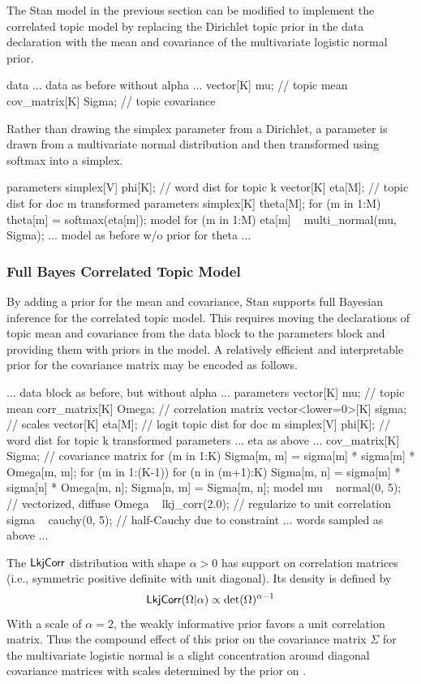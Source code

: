 The Stan model in the previous section can be modified to implement
the correlated topic model by replacing the Dirichlet topic prior
 in the data declaration with the mean and covariance of
the multivariate logistic normal prior.
%
\begin{stancode}
data {
  ... data as before without alpha ...
  vector[K] mu;          // topic mean
  cov_matrix[K] Sigma;   // topic covariance
}
\end{stancode}
%
Rather than drawing the simplex parameter  from a
Dirichlet, a parameter  is drawn from a multivariate normal
distribution and then transformed using softmax into a simplex.
%
\begin{stancode}
parameters {
  simplex[V] phi[K];  // word dist for topic k
  vector[K] eta[M];   // topic dist for doc m
}
transformed parameters {
  simplex[K] theta[M];
  for (m in 1:M)
    theta[m] = softmax(eta[m]);
}
model {
  for (m in 1:M)
    eta[m] ~ multi_normal(mu, Sigma);
  ... model as before w/o prior for theta ...
}
\end{stancode}

\subsubsection{Full Bayes Correlated Topic Model}

By adding a prior for the mean and covariance, Stan supports full
Bayesian inference for the correlated topic model.  This requires
moving the declarations of topic mean  and covariance 
from the data block to the parameters block and providing them with
priors in the model.  A relatively efficient and interpretable prior
for the covariance matrix  may be encoded as follows.
%
\begin{stancode}
... data block as before, but without alpha ...
parameters {
  vector[K] mu;              // topic mean
  corr_matrix[K] Omega;      // correlation matrix
  vector<lower=0>[K] sigma;  // scales
  vector[K] eta[M];          // logit topic dist for doc m
  simplex[V] phi[K];         // word dist for topic k
}
transformed parameters {
  ... eta as above ...
  cov_matrix[K] Sigma;       // covariance matrix
  for (m in 1:K)
    Sigma[m, m] = sigma[m] * sigma[m] * Omega[m, m];
  for (m in 1:(K-1)) {
    for (n in (m+1):K) {
      Sigma[m, n] = sigma[m] * sigma[n] * Omega[m, n];
      Sigma[n, m] = Sigma[m, n];
    }
  }
}
model {
  mu ~ normal(0, 5);      // vectorized, diffuse
  Omega ~ lkj_corr(2.0);  // regularize to unit correlation
  sigma ~ cauchy(0, 5);   // half-Cauchy due to constraint
  ... words sampled as above ...
}
\end{stancode}
%
The $\mbox{\sf LkjCorr}$ distribution with shape $\alpha > 0$ has support
on correlation matrices (i.e., symmetric positive definite with unit
diagonal).  Its density is defined by
\[
\mbox{\sf LkjCorr}(\Omega|\alpha) \propto \mbox{det}(\Omega)^{\alpha - 1}
\]
With a scale of $\alpha = 2$, the weakly informative prior favors a
unit correlation matrix.  Thus the compound effect of this prior on
the covariance matrix $\Sigma$ for the multivariate logistic normal is
a slight concentration around diagonal covariance matrices with scales
determined by the prior on .


